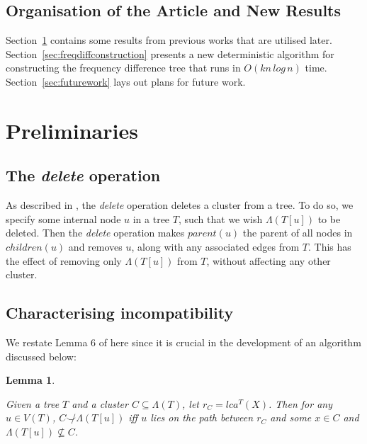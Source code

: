 \documentclass{article}
\newcommand{\compatible}{\smile}
\newcommand{\leafset}{\Lambda}
\newtheorem{incompatibility}{Lemma}
\begin{document}
    \subsection{Organisation of the Article and New Results}
    Section~\ref{sec:preliminaries} contains some results from previous works that are utilised later. Section~\ref{sec:freqdiffconstruction} presents a new deterministic algorithm for constructing the frequency difference tree that runs in $O(kn\,log\,n)$ time. Section~\ref{sec:futurework} lays out plans for future work.

    \section{Preliminaries}
    \label{sec:preliminaries}

    \subsection{The \textit{delete} operation}
    As described in \cite{jansson2018algorithms}, the \textit{delete} operation deletes a cluster from a tree. To do so, we specify some internal node $u$ in a tree $T$, such that we wish $\leafset(T[u])$ to be deleted. Then the \textit{delete} operation makes $parent(u)$ the parent of all nodes in $children(u)$ and removes $u$, along with any associated edges from $T$. This has the effect of removing only $\leafset(T[u])$ from $T$, without affecting any other cluster.

    \subsection{Characterising incompatibility}
    We restate Lemma 6 of \cite{jansson2018algorithms} here since it is crucial in the development of an algorithm discussed below:

    \begin{incompatibility}
        \label{lem:incompatibility}

        Given a tree $T$ and a cluster $C \subseteq \leafset(T)$, let $r_C = lca^T(X)$. Then for any $u \in V(T)$, $C \not\compatible \leafset(T[u])$ iff $u$ lies on the path between $r_C$ and some $x \in C$ and $\leafset(T[u]) \not\subseteq C$.
    \end{incompatibility}
\end{document}
